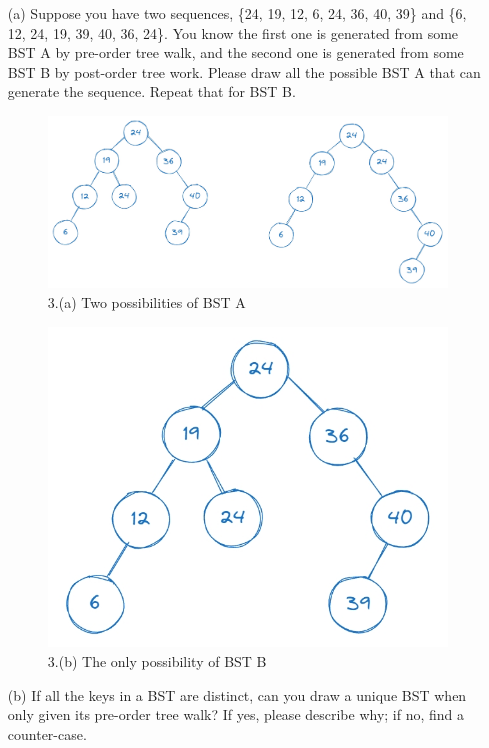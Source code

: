 \begin{enumerate}
    \item[\textred{3.}(a)] Suppose you have two sequences, \{24, 19, 12, 6, 24, 36, 40, 39\} and \{6, 12, 24, 19, 39, 40, 36, 24\}. You know the first one is generated from some BST A by pre-order tree walk, and the second one is generated from some BST B by post-order tree work. Please draw all the possible BST A that can generate the sequence. Repeat that for BST B.
\begin{figure}[!h]
    \centering
    \includegraphics[width=0.9\linewidth]{HWs/HW6/figures/3-1.png}
    \caption{3.(a) Two possibilities of BST A}
    \label{fig:bst-a}
\end{figure}
\begin{figure}[!h]
    \centering
    \includegraphics[width=0.4\linewidth]{HWs/HW6/figures/3-2.png}
    \caption{3.(b) The only possibility of BST B}
    \label{fig:bst-b}
\end{figure}
    \item[(b)] If all the keys in a BST are distinct, can you draw a unique BST when only given its pre-order tree walk? If yes, please describe why; if no, find a counter-case.\\
\end{enumerate}

